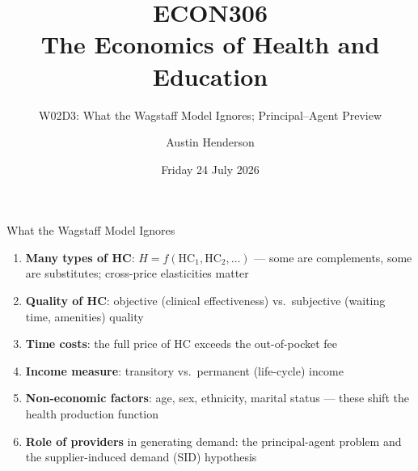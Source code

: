 \documentclass[aspectratio=169, 12pt]{beamer}
\title[ECON306: W02D3 — Wagstaff Comparative Statics]{ECON306\\The Economics of Health and Education}
\subtitle{W02D3: What the Wagstaff Model Ignores; Principal--Agent Preview}
\author{Austin Henderson}
\institute{Department of Economics\\University of Otago}
\date{Friday 24 July 2026}
\begin{document}
\begin{frame}[plain]
  \titlepage
\end{frame}



\begin{frame}{What the Wagstaff Model Ignores}
  \begin{enumerate}
    \item \textbf{Many types of HC}: $H = f(\text{HC}_1, \text{HC}_2, \ldots)$ --- some are
          complements, some are substitutes; cross-price elasticities matter
    \item \textbf{Quality of HC}: objective (clinical effectiveness) vs.\ subjective
          (waiting time, amenities) quality
    \item \textbf{Time costs}: the full price of HC exceeds the out-of-pocket fee
    \item \textbf{Income measure}: transitory vs.\ permanent (life-cycle) income
    \item \textbf{Non-economic factors}: age, sex, ethnicity, marital status --- these
          shift the health production function
    \item \textbf{Role of providers} in generating demand: the principal-agent problem
          and the supplier-induced demand (SID) hypothesis
  \end{enumerate}
\end{frame}
\end{document}
